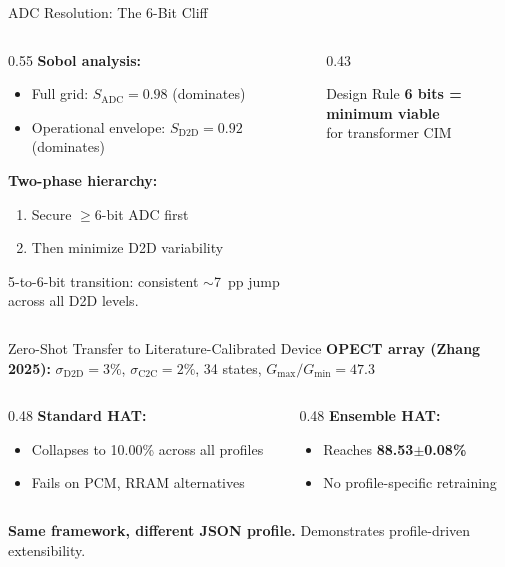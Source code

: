 \documentclass[aspectratio=169,11pt]{beamer}
\begin{document}
\begin{frame}{ADC Resolution: The 6-Bit Cliff}
  \begin{columns}
    \begin{column}{0.55\textwidth}
      \textbf{Sobol analysis:}
      \begin{itemize}
        \item Full grid: $S_{\text{ADC}} = 0.98$ (dominates)
        \item Operational envelope: $S_{\text{D2D}} = 0.92$ (dominates)
      \end{itemize}
      \textbf{Two-phase hierarchy:}
      \begin{enumerate}
        \item Secure $\geq$6-bit ADC first
        \item Then minimize D2D variability
      \end{enumerate}
      \vfill
      5-to-6-bit transition: consistent $\sim$7~pp jump across all D2D levels.
    \end{column}
    \begin{column}{0.43\textwidth}
      \begin{block}{Design Rule}
        \centering
        \textbf{6 bits = minimum viable}\\
        for transformer CIM
      \end{block}
    \end{column}
  \end{columns}
\end{frame}

\begin{frame}{Zero-Shot Transfer to Literature-Calibrated Device}
  \textbf{OPECT array (Zhang 2025):} $\sigma_{\text{D2D}} = 3\%$, $\sigma_{\text{C2C}} = 2\%$, 34 states, $G_{\max}/G_{\min} = 47.3$
  \vfill
  \begin{columns}
    \begin{column}{0.48\textwidth}
      \textbf{Standard HAT:}
      \begin{itemize}
        \item Collapses to 10.00\% across all profiles
        \item Fails on PCM, RRAM alternatives
      \end{itemize}
    \end{column}
    \begin{column}{0.48\textwidth}
      \textbf{Ensemble HAT:}
      \begin{itemize}
        \item Reaches \textbf{88.53$\pm$0.08\%}
        \item No profile-specific retraining
      \end{itemize}
    \end{column}
  \end{columns}
  \vfill
  \centering
  \textbf{Same framework, different JSON profile.} Demonstrates profile-driven extensibility.
\end{frame}
\end{document}
